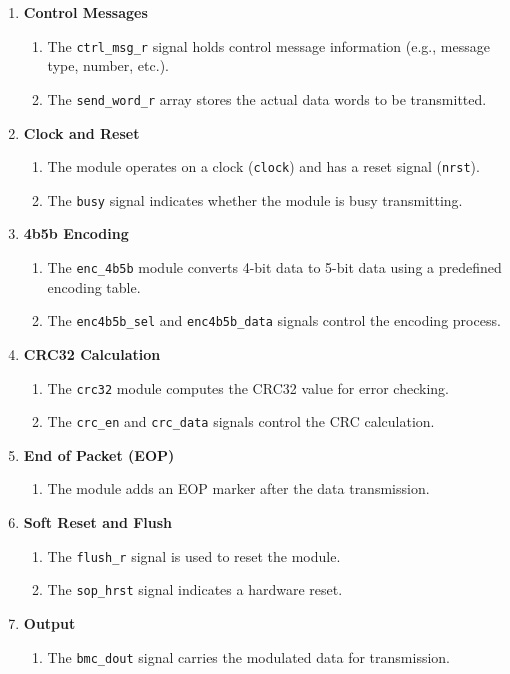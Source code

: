 \begin{enumerate}
    \item \textbf{Control Messages}
    \begin{enumerate}
        \item The \texttt{ctrl\_msg\_r} signal holds control message information (e.g., message type, number, etc.).
        \item The \texttt{send\_word\_r} array stores the actual data words to be transmitted.
    \end{enumerate}

    \item \textbf{Clock and Reset}
    \begin{enumerate}
        \item The module operates on a clock (\texttt{clock}) and has a reset signal (\texttt{nrst}).
        \item The \texttt{busy} signal indicates whether the module is busy transmitting.
    \end{enumerate}

    \item \textbf{4b5b Encoding}
    \begin{enumerate}
        \item The \texttt{enc\_4b5b} module converts 4-bit data to 5-bit data using a predefined encoding table.
        \item The \texttt{enc4b5b\_sel} and \texttt{enc4b5b\_data} signals control the encoding process.
    \end{enumerate}

    \item \textbf{CRC32 Calculation}
    \begin{enumerate}
        \item The \texttt{crc32} module computes the CRC32 value for error checking.
        \item The \texttt{crc\_en} and \texttt{crc\_data} signals control the CRC calculation.
    \end{enumerate}

    \item \textbf{End of Packet (EOP)}
    \begin{enumerate}
        \item The module adds an EOP marker after the data transmission.
    \end{enumerate}

    \item \textbf{Soft Reset and Flush}
    \begin{enumerate}
        \item The \texttt{flush\_r} signal is used to reset the module.
        \item The \texttt{sop\_hrst} signal indicates a hardware reset.
    \end{enumerate}

    \item \textbf{Output}
    \begin{enumerate}
        \item The \texttt{bmc\_dout} signal carries the modulated data for transmission.
    \end{enumerate}
\end{enumerate}
